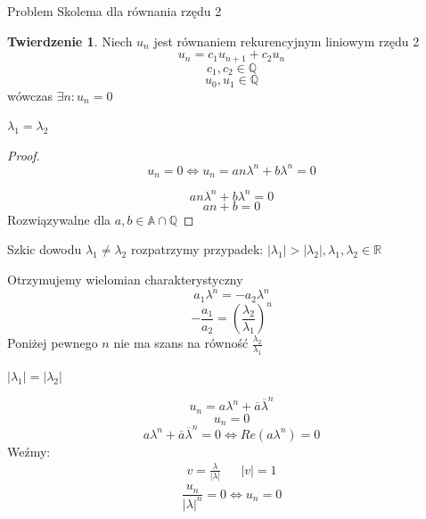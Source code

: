\documentclass[handout]{beamer}
\def\Q{\mathbb{Q}}
\def\A{\mathbb{A}}
\theoremstyle{definition}
\newtheorem*{twierdzenie}{Twierdzenie}
\begin{document}
\begin{frame}{Problem Skolema dla równania rzędu 2}


\begin{twierdzenie}
    Niech $u_n$ jest równaniem rekurencyjnym liniowym rzędu 2
    $$
        u_n = c_1 u_{n+1} + c_2 u_n
    $$
    $$
        c_1, c_2 \in \mathbb{Q}
    $$
    $$
        u_0, u_1 \in \mathbb{Q}
    $$
    wówczas $\exists n : u_n = 0$
\end{twierdzenie}

\end{frame}

\begin{frame}{$\lambda_1= \lambda_2$}

\begin{proof}
    $$u_n = 0 \iff  u_n = a n \lambda^{n} + b \lambda^{n} = 0$$
    
    $$ a n \lambda^{n} + b \lambda^{n} = 0 $$
    $$ a n + b = 0 $$
    Rozwiązywalne dla $a, b \in \A \cap \Q $
\end{proof}

    
\end{frame}

\begin{frame}{Szkic dowodu $\lambda_1 \neq \lambda_2$}
    rozpatrzymy przypadek:
    $|\lambda_1| > |\lambda_2|, \lambda_1, \lambda_2 \in \mathbb{R}$
    
    Otrzymujemy wielomian charakterystyczny 
    $$
       a_1 \lambda^{n} = - a_2 \lambda^{n}
    $$
    $$
        - \frac{a_1}{a_2} = (\frac{\lambda_2}{\lambda_1})^{n}
    $$
    Poniżej pewnego $n$ nie ma szans na równość $\frac{\lambda_2}{\lambda_1}$
\end{frame}

\begin{frame}{$|\lambda_1| = |\lambda_2|$}

\begin{equation*}
    u_n = a \lambda^{n} + \overline{a} \overline{\lambda}^{n} 
\end{equation*}
\pause 
\begin{equation*}
    u_n = 0 
\end{equation*}
\pause 
\begin{equation*}
    a \lambda^{n} + \overline{a} \overline{\lambda}^{n} = 0 \iff Re(a {\lambda^{n}}) = 0 
\end{equation*} 
\pause
Weźmy: 
\begin{align*}
    v = \frac{\lambda}{|\lambda|} && |v| = 1
\end{align*}
$$\frac{u_n}{|\lambda|^{n}} = 0 \iff u_n = 0$$

\end{frame}
    
\end{document}
